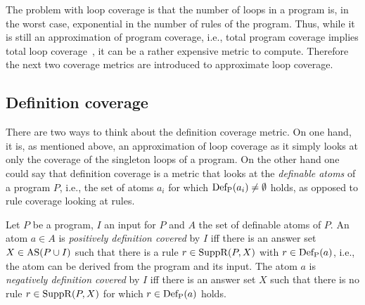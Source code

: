 The problem with loop coverage is that the number of loops in a program is, in the worst case, exponential in the number of rules of the program. Thus, while it is still an approximation of program coverage, i.e., total program coverage implies total loop coverage~\cite{Jan+10}, it can be a rather expensive metric to compute. Therefore the next two coverage metrics are introduced to approximate loop coverage.

\begin{comment}
    - loops play an important role in ASP as seen in (source). Therefore constructing a coverage metric that focuses on them makes sense        \/
    
    - Definition + example      \/
    
    - generally number of loops in a program in exponential in the number of rules -> expensive to compute! -> introduce 2 more coverage metrics that approximate loop coverage! (one for minimal (singleton) loops and one for maximal loops (strongyl connected components))      \/
    
    (- no real relation to rule coverage (neither implies the other)
    
    - total program coverage implies total loop coverage -> not so relevant but maybe interesting to mention?)
\end{comment}

\subsection{Definition coverage}
\label{subsec:Coverage metrics/Branch-like coverage/Definition coverage}
There are two ways to think about the definition coverage metric. On one hand, it is, as mentioned above, an approximation of loop coverage as it simply looks at only the coverage of the singleton loops of a program. On the other hand one could say that definition coverage is a metric that looks at the \emph{definable atoms} of a program $P$, i.e., the set of atoms $a_i$ for which \(\operatorname{Def_P}(a_i) \neq \emptyset\) holds, as opposed to rule coverage looking at rules.

\begin{definition}
\label{def:definition coverage}
    Let $P$ be a program, $I$ an input for $P$ and $A$ the set of definable atoms of $P$. An atom \(a \in A\) is \emph{positively definition covered} by $I$ iff there is an answer set \(X \in \operatorname{AS}(P \cup I)\) such that there is a rule \(r \in \operatorname{SuppR}(P, X)\) with \(r \in \operatorname{Def_P}(a)\), i.e., the atom can be derived from the program and its input.
    The atom $a$ is \emph{negatively definition covered} by $I$ iff there is an answer set $X$ such that there is no rule \(r \in \operatorname{SuppR}(P, X)\) for which \(r \in \operatorname{Def_P}(a)\) holds.
\end{definition}


